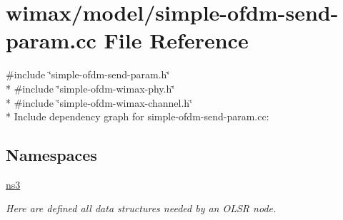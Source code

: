 \hypertarget{simple-ofdm-send-param_8cc}{}\section{wimax/model/simple-\/ofdm-\/send-\/param.cc File Reference}
\label{simple-ofdm-send-param_8cc}
{\ttfamily \#include \char`\"{}simple-\/ofdm-\/send-\/param.\+h\char`\"{}}\\*
{\ttfamily \#include \char`\"{}simple-\/ofdm-\/wimax-\/phy.\+h\char`\"{}}\\*
{\ttfamily \#include \char`\"{}simple-\/ofdm-\/wimax-\/channel.\+h\char`\"{}}\\*
Include dependency graph for simple-\/ofdm-\/send-\/param.cc\+:
\subsection*{Namespaces}
\begin{DoxyCompactItemize}
\item 
 \hyperlink{namespacens3}{ns3}
\begin{DoxyCompactList}\small\item\em Here are defined all data structures needed by an O\+L\+SR node. \end{DoxyCompactList}\end{DoxyCompactItemize}
